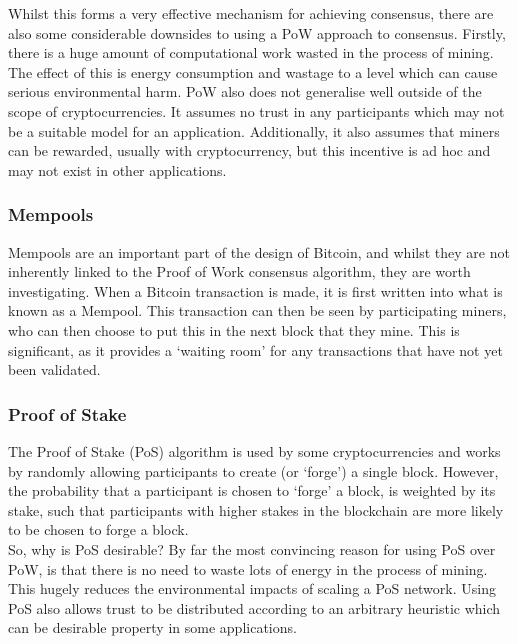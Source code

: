 \documentclass[12pt,a4paper,twoside,openright]{report}
\begin{document}
	Whilst this forms a very effective mechanism for achieving consensus, there are also some considerable downsides to using a PoW approach to consensus. 
	Firstly, there is a huge amount of computational work wasted in the process of mining. 
	The effect of this is energy consumption \cite{BitcoinEnergy} and wastage to a level which can cause serious environmental harm.
	PoW also does not generalise well outside of the scope of cryptocurrencies.
	It assumes no trust in any participants which may not be a suitable model for an application. 
	Additionally, it also assumes that miners can be rewarded, usually with cryptocurrency, but this incentive is ad hoc and may not exist in other applications.
	
	\subsubsection*{Mempools}
	Mempools are an important part of the design of Bitcoin, and whilst they are not inherently linked to the Proof of Work consensus algorithm, they are worth investigating. 
	When a Bitcoin transaction is made, it is first written into what is known as a Mempool. 
	This transaction can then be seen by participating miners, who can then choose to put this in the next block that they mine. 
	This is significant, as it provides a `waiting room' for any transactions that have not yet been validated.  

	\subsubsection*{Proof of Stake}
	The Proof of Stake (PoS) algorithm is used by some cryptocurrencies and works by randomly allowing participants to create (or `forge') a single block.
	However, the probability that a participant is chosen to `forge' a block, is weighted by its stake, such that participants with higher stakes in the blockchain are more likely to be chosen to forge a block.\\

	So, why is PoS desirable? 
	By far the most convincing reason for using PoS over PoW, is that there is no need to waste lots of energy in the process of mining. 
	This hugely reduces the environmental impacts of scaling a PoS network.
	Using PoS also allows trust to be distributed according to an arbitrary heuristic which can be desirable property in some applications.\\
\end{document}
